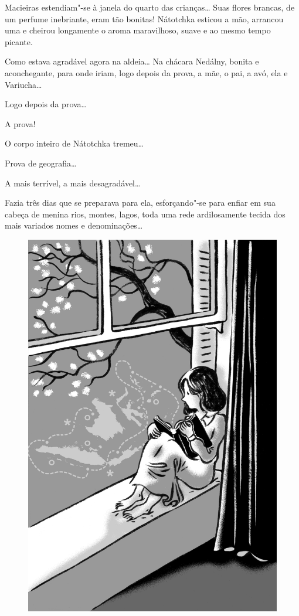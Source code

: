 Macieiras estendiam"-se à janela do quarto das crianças\ldots{} Suas flores
brancas, de um perfume inebriante, eram tão bonitas! Nátotchka esticou a
mão, arrancou uma e cheirou longamente o aroma maravilhoso, suave e ao
mesmo tempo picante.

Como estava agradável agora na aldeia\ldots{} Na chácara Nedálny, bonita e
aconchegante, para onde iriam, logo depois da prova, a mãe, o pai, a
avó, ela e Variucha\ldots{}

Logo depois da prova\ldots{}

A prova!

O corpo inteiro de Nátotchka tremeu\ldots{}

Prova de geografia\ldots{}

A mais terrível, a mais desagradável\ldots{}

Fazia três dias que se preparava para ela, esforçando"-se para enfiar em
sua cabeça de menina rios, montes, lagos, toda uma rede ardilosamente
tecida dos mais variados nomes e denominações\ldots{}

\begin{figure}%
\vspace*{-1.6cm}
\hspace*{-2cm}\includegraphics[width=140mm]{./imgs/cena12.jpg}
\end{figure}

